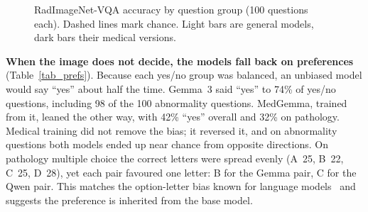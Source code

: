 \documentclass[doublecolumn]{ijcvsplatex}
\newcommand{\gemma}{Gemma~3}
\newcommand{\medgemma}{MedGemma}
\begin{document}
\begin{figure}[tb]
\centering
{}
\caption{RadImageNet-VQA accuracy by question group (100 questions each). Dashed lines mark chance. Light bars are general models, dark bars their medical versions.}
\label{fig_radimagenet}
\end{figure}

\textbf{When the image does not decide, the models fall back on preferences} (Table~\ref{tab_prefs}). Because each yes/no group was balanced, an unbiased model would say ``yes'' about half the time. \gemma{} said ``yes'' to 74\% of yes/no questions, including 98 of the 100 abnormality questions. \medgemma{}, trained from it, leaned the other way, with 42\% ``yes'' overall and 32\% on pathology. Medical training did not remove the bias; it reversed it, and on abnormality questions both models ended up near chance from opposite directions. On pathology multiple choice the correct letters were spread evenly (A~25, B~22, C~25, D~28), yet each pair favoured one letter: B for the Gemma pair, C for the Qwen pair. This matches the option-letter bias known for language models~\cite{zheng2024mcqbias} and suggests the preference is inherited from the base model.
\end{document}
